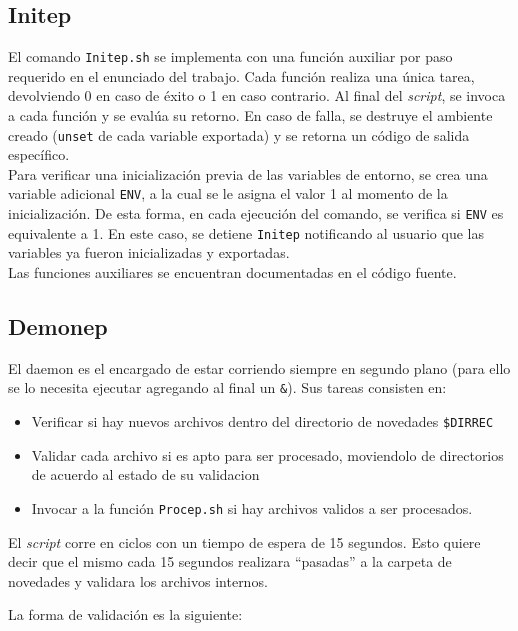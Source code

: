\documentclass[10pt,a4paper]{article}
\begin{document}
\subsection{Initep}
El comando \texttt{Initep.sh} se implementa con una función auxiliar por paso requerido en el enunciado del trabajo. Cada función realiza una única tarea, devolviendo 0 en caso de éxito o 1 en caso contrario. Al final del \textit{script}, se invoca a cada función y se evalúa su retorno. En caso de falla, se destruye el ambiente creado (\texttt{unset} de cada variable exportada) y se retorna un código de salida específico.\\
Para verificar una inicialización previa de las variables de entorno, se crea una variable adicional \texttt{ENV}, a la cual se le asigna el valor 1 al momento de la inicialización. De esta forma, en cada ejecución del comando, se verifica si \texttt{ENV} es equivalente a 1. En este caso, se detiene \texttt{Initep} notificando al usuario que las variables ya fueron inicializadas y exportadas.\\
Las funciones auxiliares se encuentran documentadas en el código fuente.

\subsection{Demonep}
El daemon es el encargado de estar corriendo siempre en segundo plano (para ello se lo necesita ejecutar agregando al final un \texttt{\&}). Sus tareas consisten en:

\begin{itemize}
    \item  Verificar si hay nuevos archivos dentro del directorio de novedades \texttt{\$DIRREC}
    
    \item Validar cada archivo si es apto para ser procesado, moviendolo de directorios de acuerdo al estado de su validacion
    
    \item Invocar a la función \texttt{Procep.sh} si hay archivos validos a ser procesados.
\end{itemize}

El \textit{script} corre en ciclos con un tiempo de espera de 15 segundos. Esto quiere decir que el mismo cada 15 segundos realizara ``pasadas'' a la carpeta de novedades y validara los archivos internos.

La forma de validación es la siguiente:
\end{document}
